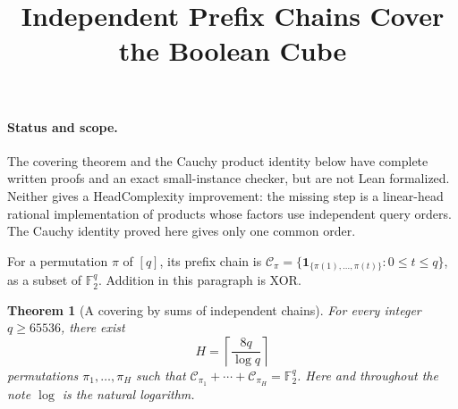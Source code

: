\documentclass[11pt]{article}
\title{Independent Prefix Chains Cover the Boolean Cube}
\author{}\date{}
\newtheorem{theorem}{Theorem}
\begin{document}
\maketitle

\paragraph{Status and scope.}
The covering theorem and the Cauchy product identity below have complete
written proofs and an exact small-instance checker, but are not Lean
formalized. Neither gives a HeadComplexity improvement: the missing
step is a linear-head rational implementation of products whose factors
use independent query orders. The Cauchy identity proved here gives
only one common order.

For a permutation $\pi$ of $[q]$, its prefix chain is
$\mathcal C_\pi=\{\mathbf 1_{\{\pi(1),\ldots,\pi(t)\}}:0\leq t\leq q\}$,
as a subset of $\mathbb F_2^q$. Addition in this paragraph is XOR.

\begin{theorem}[A covering by sums of independent chains]
For every integer $q\geq 65536$, there exist
\[
 H=\left\lceil\frac{8q}{\log q}\right\rceil
\]
permutations $\pi_1,\ldots,\pi_H$ such that
$\mathcal C_{\pi_1}+\cdots+\mathcal C_{\pi_H}=\mathbb F_2^q$.
Here and throughout the note $\log$ is the natural logarithm.
\end{theorem}
\end{document}
